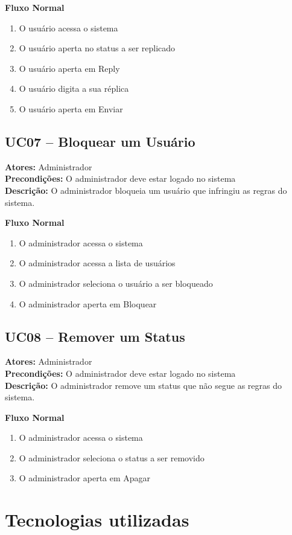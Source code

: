 \documentclass[12pt]{article}
\begin{document}
\textbf{Fluxo Normal}
\begin{enumerate}
  \item O usuário acessa o sistema
  \item O usuário aperta no status a ser replicado
  \item O usuário aperta em Reply
  \item O usuário digita a sua réplica
  \item O usuário aperta em Enviar
\end{enumerate}

\subsection{UC07 -- Bloquear um Usuário}
\textbf{Atores:} Administrador \\
\textbf{Precondições:} O administrador deve estar logado no sistema \\
\textbf{Descrição:} O administrador bloqueia um usuário que infringiu as regras do sistema.

\textbf{Fluxo Normal}
\begin{enumerate} \item O administrador acessa o sistema
  \item O administrador acessa a lista de usuários
  \item O administrador seleciona o usuário a ser bloqueado
  \item O administrador aperta em Bloquear
\end{enumerate}

\subsection{UC08 -- Remover um Status}
\textbf{Atores:} Administrador \\
\textbf{Precondições:} O administrador deve estar logado no sistema \\
\textbf{Descrição:} O administrador remove um status que não segue as regras do sistema.

\textbf{Fluxo Normal}
\begin{enumerate}
  \item O administrador acessa o sistema
  \item O administrador seleciona o status a ser removido
  \item O administrador aperta em Apagar
\end{enumerate}


\section{Tecnologias utilizadas}
\end{document}
